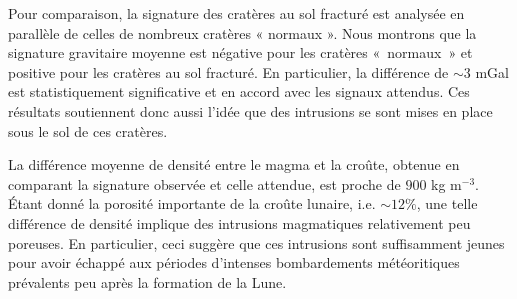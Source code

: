 Pour comparaison, la signature des cratères au sol fracturé est
analysée en parallèle de celles de nombreux cratères « normaux ».
Nous montrons que la signature gravitaire moyenne est négative pour
les cratères « normaux » et positive pour les cratères au sol
fracturé. En particulier, la différence de $\sim 3$ mGal est
statistiquement significative et en accord avec les signaux attendus.
Ces résultats soutiennent donc aussi l'idée que des intrusions se sont
mises en place sous le sol de ces cratères.

La différence moyenne de densité entre le magma et la croûte, obtenue
en comparant la signature observée et celle attendue, est proche de $900$ kg m$^{-3}$. Étant donné la
porosité importante de la croûte lunaire, i.e. $\sim 12\%$, une telle
différence de densité implique des intrusions magmatiques relativement
peu poreuses. En particulier, ceci suggère que ces intrusions sont
suffisamment jeunes pour avoir échappé aux périodes d’intenses
bombardements météoritiques prévalents peu après la formation de la
Lune.


